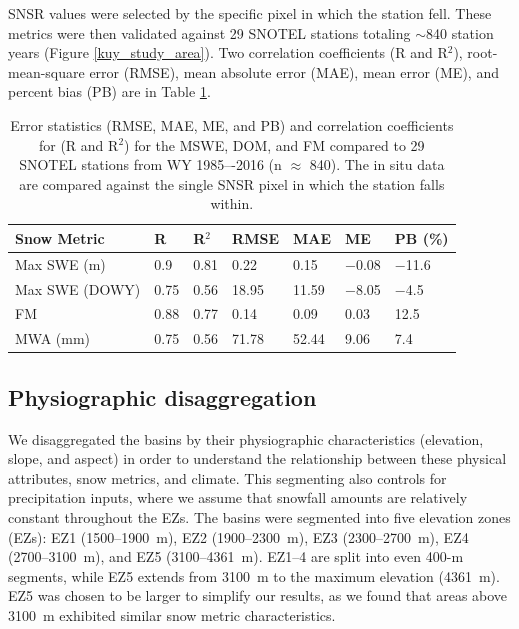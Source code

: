 SNSR values were selected by the specific pixel in which the station fell. These metrics were then validated against 29 SNOTEL stations totaling $\sim$840 station years (Figure \ref{kuy_study_area}). Two correlation coefficients (R and R$^{2}$), root-mean-square error (RMSE), mean absolute error (MAE), mean error (ME), and percent bias (PB) are in Table \ref{tab:snow_metrics_val_table}.

\begin{table}[htbp]
  \centering
  \caption{Error statistics (RMSE, MAE, ME, and PB) and correlation coefficients for (R and R$^{2}$) for the MSWE, DOM, and FM compared to 29 SNOTEL stations from WY 1985–-2016 (n $\approx$ 840). The in situ data are compared against the single SNSR pixel in which the station falls within.}
  \label{tab:snow_metrics_val_table}
  \begin{tabular}{lllllll}
    \toprule
    Snow Metric & R & R$^{2}$ & RMSE & MAE & ME & PB (\%) \\
    \midrule
    Max SWE (m) & 0.9 & 0.81 & 0.22 & 0.15 & $-$0.08 & $-$11.6 \\
    Max SWE (DOWY) & 0.75 & 0.56 & 18.95 & 11.59 & $-$8.05 & $-$4.5 \\
    FM & 0.88 & 0.77 & 0.14 & 0.09 & 0.03 & 12.5 \\
    MWA (mm) & 0.75 & 0.56 & 71.78 & 52.44 & 9.06 & 7.4 \\
    \bottomrule
  \end{tabular}
\end{table}

\hypertarget{ch2-methods-2}{\subsection{Physiographic disaggregation}\label{ch2-methods-2}}

We disaggregated the basins by their physiographic characteristics (elevation, slope, and aspect) in order to understand the relationship between these physical attributes, snow metrics, and climate. This segmenting also controls for precipitation inputs, where we assume that snowfall amounts are relatively constant throughout the EZs. The basins were segmented into five elevation zones (EZs): EZ1 (1500--1900~m), EZ2 (1900--2300~m), EZ3 (2300--2700~m), EZ4 (2700--3100~m), and EZ5 (3100--4361~m). EZ1--4 are split into even 400-m segments, while EZ5 extends from 3100~m to the maximum elevation (4361~m). EZ5 was chosen to be larger to simplify our results, as we found that areas above 3100~m exhibited similar snow metric characteristics. 

